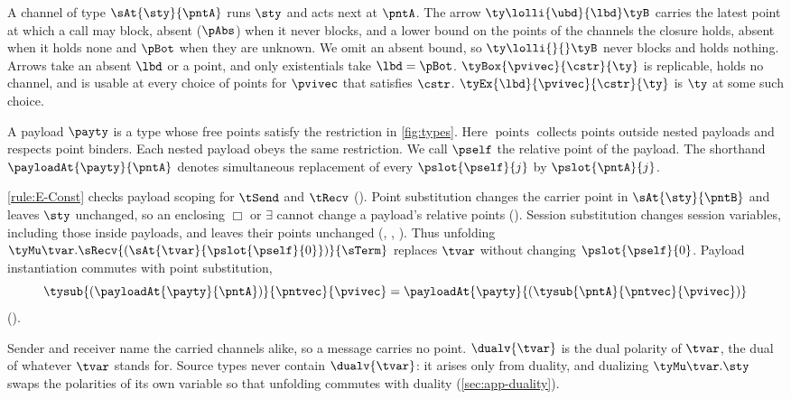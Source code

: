 A channel of type $\sAt{\sty}{\pntA}$ runs $\sty$ and acts next at
$\pntA$. The arrow $\ty \lolli{\ubd}{\lbd} \tyB$ carries the latest
point at which a call may block, absent ($\pAbs$) when it never blocks,
and a lower bound on the points of the channels the closure holds, absent
when it holds none and $\pBot$ when they are unknown. We omit an absent
bound, so $\ty \lolli{}{} \tyB$ never blocks and holds nothing. Arrows
take an absent $\lbd$ or a point, and only existentials take
$\lbd = \pBot$. $\tyBox{\pvivec}{\cstr}{\ty}$ is replicable, holds no
channel, and is usable at every choice of points for $\pvivec$ that
satisfies $\cstr$. $\tyEx{\lbd}{\pvivec}{\cstr}{\ty}$ is $\ty$ at some
such choice.

\begin{definition}
\label{def:payload}
  A payload $\payty$ is a type whose free points satisfy the restriction
  in \cref{fig:types}. Here $\operatorname{points}$ collects points outside
  nested payloads and respects point binders. Each nested payload obeys
  the same restriction. We call $\pself$ the relative point of the payload.
  The shorthand $\payloadAt{\payty}{\pntA}$ denotes simultaneous
  replacement of every $\pslot{\pself}{j}$ by $\pslot{\pntA}{j}$.
\end{definition}

\begin{remark}
\label{rm:payload}
  \ref{rule:E-Const} checks payload scoping for $\tSend$ and $\tRecv$
  (). Point substitution changes the carrier point in
  $\sAt{\sty}{\pntB}$ and leaves $\sty$ unchanged, so an enclosing
  $\Box$ or $\exists$ cannot change a payload's relative points
  (). Session substitution changes session variables,
  including those inside payloads, and leaves their points unchanged
  (, , ). Thus unfolding
  $\tyMu\tvar.\sRecv{(\sAt{\tvar}{\pslot{\pself}{0}})}{\sTerm}$
  replaces $\tvar$ without changing $\pslot{\pself}{0}$.
  Payload instantiation commutes with point substitution,
  \[
    \tysub{(\payloadAt{\payty}{\pntA})}{\pntvec}{\pvivec}
      = \payloadAt{\payty}{(\tysub{\pntA}{\pntvec}{\pvivec})}
  \]
  ().
\end{remark}

Sender and receiver name the carried channels alike, so a message
carries no point. $\dualv{\tvar}$ is the dual polarity of $\tvar$, the
dual of whatever $\tvar$ stands for. Source types never contain
$\dualv{\tvar}$: it arises only from duality, and dualizing
$\tyMu\tvar.\sty$ swaps the polarities of its own variable so that
unfolding commutes with duality (\cref{sec:app-duality}).

